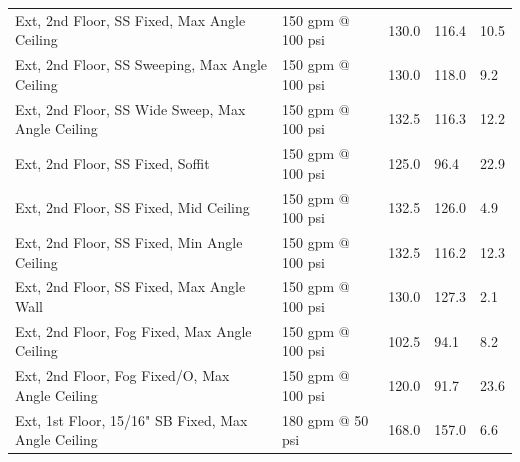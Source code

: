 \documentclass{book}
\begin{document}
\begin{table}[]
\begin{tabular}{lllll}
Ext, 2nd Floor, SS Fixed, Max Angle Ceiling           & 150 gpm @ 100 psi                   & 130.0                                  & 116.4                                   & 10.5                                    \\
Ext, 2nd Floor, SS Sweeping, Max Angle Ceiling        & 150 gpm @ 100 psi                   & 130.0                                  & 118.0                                   & 9.2                                     \\
Ext, 2nd Floor, SS Wide Sweep, Max Angle Ceiling      & 150 gpm @ 100 psi                   & 132.5                                  & 116.3                                   & 12.2                                    \\
Ext, 2nd Floor, SS Fixed, Soffit                      & 150 gpm @ 100 psi                   & 125.0                                  & 96.4                                    & 22.9                                    \\
Ext, 2nd Floor, SS Fixed, Mid Ceiling                 & 150 gpm @ 100 psi                   & 132.5                                  & 126.0                                   & 4.9                                     \\
Ext, 2nd Floor, SS Fixed, Min Angle Ceiling           & 150 gpm @ 100 psi                   & 132.5                                  & 116.2                                   & 12.3                                    \\
Ext, 2nd Floor, SS Fixed, Max Angle Wall              & 150 gpm @ 100 psi                   & 130.0                                  & 127.3                                   & 2.1                                     \\
Ext, 2nd Floor, Fog Fixed, Max Angle Ceiling          & 150 gpm @ 100 psi                   & 102.5                                  & 94.1                                    & 8.2                                     \\
Ext, 2nd Floor, Fog Fixed/O, Max Angle Ceiling        & 150 gpm @ 100 psi                   & 120.0                                  & 91.7                                    & 23.6                                    \\
Ext, 1st Floor, 15/16" SB Fixed, Max Angle Ceiling    & 180 gpm @ 50 psi                    & 168.0                                  & 157.0                                   & 6.6                                     \\

\end{tabular}
\end{table}
\end{document}
